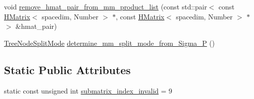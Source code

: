 \begin{DoxyCompactItemize}
\item 
void \hyperlink{classHMatrix_ae0ab9b3be4ea0ef959da40e81313b2e3}{remove\+\_\+hmat\+\_\+pair\+\_\+from\+\_\+mm\+\_\+product\+\_\+list} (const std\+::pair$<$ const \hyperlink{classHMatrix}{H\+Matrix}$<$ spacedim, Number $>$ $\ast$, const \hyperlink{classHMatrix}{H\+Matrix}$<$ spacedim, Number $>$ $\ast$$>$ \&hmat\+\_\+pair)
\item 
\hyperlink{tree_8h_a922ca07db9633957939f697a65aff11d}{Tree\+Node\+Split\+Mode} \hyperlink{classHMatrix_a6f24998c7de1d0e336577be41c6281e3}{determine\+\_\+mm\+\_\+split\+\_\+mode\+\_\+from\+\_\+\+Sigma\+\_\+P} ()
\end{DoxyCompactItemize}
\subsection*{Static Public Attributes}
\begin{DoxyCompactItemize}
\item 
static const unsigned int \hyperlink{classHMatrix_a8b5a9fb65c716187d95bcdb43542884c}{submatrix\+\_\+index\+\_\+invalid} = 9
\end{DoxyCompactItemize}
